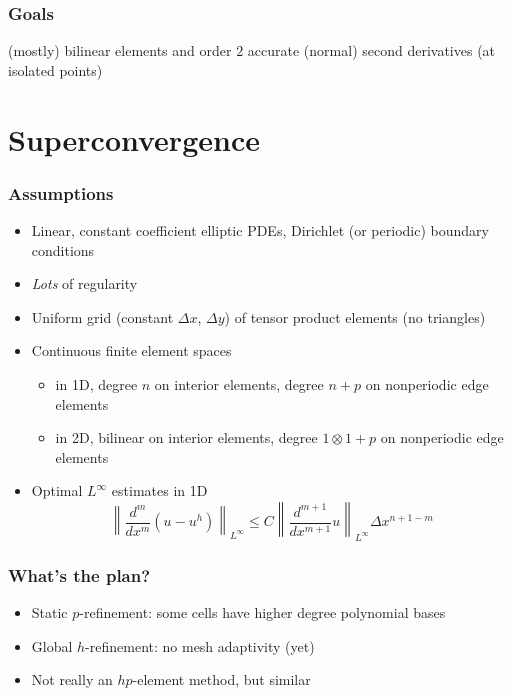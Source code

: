 \documentclass[8pt]{beamer}
\begin{document}
    \begin{frame}
        \frametitle{Goals}
        \begin{center}
            (mostly) bilinear elements and order \(2\) accurate (normal)
            second derivatives (at isolated points)
        \end{center}
    \end{frame}

\section{Superconvergence}
\begin{frame}
    \frametitle{Assumptions}
    \begin{itemize}
        \item Linear, constant coefficient elliptic PDEs, Dirichlet (or
              periodic) boundary conditions
              \pause
        \item \emph{Lots} of regularity
              \pause
        \item Uniform grid (constant \(\Delta x\), \(\Delta y\)) of tensor
              product elements (no triangles)
              \pause
        \item Continuous finite element spaces
              \begin{itemize}
                  \item in 1D, degree \(n\) on interior elements, degree \(n +
                        p\) on nonperiodic edge elements
                  \item in 2D, bilinear on interior elements, degree \(1 \otimes
                        1 + p\) on nonperiodic edge elements
              \end{itemize}
              \pause
        \item Optimal \(L^\infty\) estimates in 1D
              \begin{equation*}
                  \left\|\dfrac{d^m}{dx^m}(u - u^h)\right\|_{L^\infty}
                  \leq C \left\|\dfrac{d^{m + 1}}{dx^{m + 1}} u\right\|_{L^\infty}
                  \Delta x^{n + 1- m}
              \end{equation*}
    \end{itemize}
\end{frame}

\begin{frame}
    \frametitle{What's the plan?}
    \begin{itemize}
        \item Static \(p\)-refinement: some cells have higher degree polynomial bases
        \item Global \(h\)-refinement: no mesh adaptivity (yet)
        \item Not really an \(hp\)-element method, but similar
    \end{itemize}
\end{frame}
\end{document}
